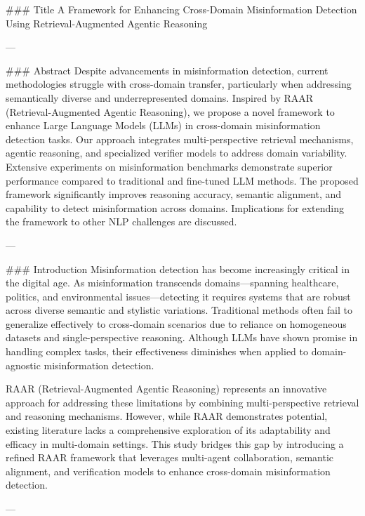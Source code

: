 ### Title
A Framework for Enhancing Cross-Domain Misinformation Detection Using Retrieval-Augmented Agentic Reasoning

---

### Abstract
Despite advancements in misinformation detection, current methodologies struggle with cross-domain transfer, particularly when addressing semantically diverse and underrepresented domains. Inspired by RAAR (Retrieval-Augmented Agentic Reasoning), we propose a novel framework to enhance Large Language Models (LLMs) in cross-domain misinformation detection tasks. Our approach integrates multi-perspective retrieval mechanisms, agentic reasoning, and specialized verifier models to address domain variability. Extensive experiments on misinformation benchmarks demonstrate superior performance compared to traditional and fine-tuned LLM methods. The proposed framework significantly improves reasoning accuracy, semantic alignment, and capability to detect misinformation across domains. Implications for extending the framework to other NLP challenges are discussed.

---

### Introduction
Misinformation detection has become increasingly critical in the digital age. As misinformation transcends domains—spanning healthcare, politics, and environmental issues—detecting it requires systems that are robust across diverse semantic and stylistic variations. Traditional methods often fail to generalize effectively to cross-domain scenarios due to reliance on homogeneous datasets and single-perspective reasoning. Although LLMs have shown promise in handling complex tasks, their effectiveness diminishes when applied to domain-agnostic misinformation detection.

RAAR (Retrieval-Augmented Agentic Reasoning) represents an innovative approach for addressing these limitations by combining multi-perspective retrieval and reasoning mechanisms. However, while RAAR demonstrates potential, existing literature lacks a comprehensive exploration of its adaptability and efficacy in multi-domain settings. This study bridges this gap by introducing a refined RAAR framework that leverages multi-agent collaboration, semantic alignment, and verification models to enhance cross-domain misinformation detection.

---

